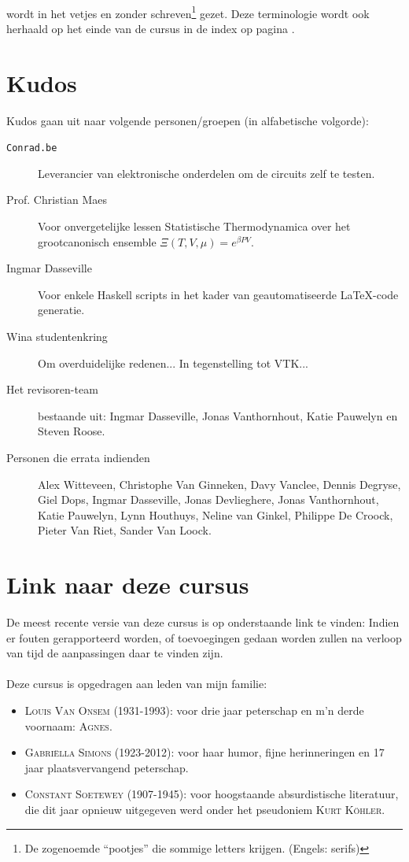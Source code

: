 \documentclass[a4paper,10pt,titlepage]{book}
\begin{document}
\begin{it}
\paragraph{}
 wordt in het vetjes en zonder schreven\footnote{De zogenoemde ``pootjes'' die sommige letters krijgen. (Engels: serifs)} gezet. Deze terminologie wordt ook herhaald op het einde van de cursus in de index op pagina \pageref{idx}.

\section*{Kudos}
Kudos gaan uit naar volgende personen/groepen (in alfabetische volgorde):
\begin{description}
 \item[\texttt{Conrad.be}] Leverancier van elektronische onderdelen om de circuits zelf te testen.
 \item[Prof. Christian Maes] Voor onvergetelijke lessen Statistische Thermodynamica over het grootcanonisch ensemble $\Xi\left(T,V,\mu\right)=e^{\beta PV}$.
 \item[Ingmar Dasseville] Voor enkele Haskell scripts in het kader van geautomatiseerde \LaTeX-code generatie.
 \item[Wina studentenkring] Om overduidelijke redenen... In tegenstelling tot VTK...
 \item[Het revisoren-team] bestaande uit: Ingmar Dasseville, Jonas Vanthornhout, Katie Pauwelyn en Steven Roose.
 \item[Personen die errata indienden] Alex Witteveen, Christophe Van Ginneken, Davy Vanclee, Dennis Degryse, Giel Dops, Ingmar Dasseville, Jonas Devlieghere, Jonas Vanthornhout, Katie Pauwelyn, Lynn Houthuys, Neline van Ginkel, Philippe De Croock, Pieter Van Riet, Sander Van Loock.
\end{description}
\section*{Link naar deze cursus}
De meest recente versie van deze cursus is op onderstaande link te vinden:
Indien er fouten gerapporteerd worden, of toevoegingen gedaan worden zullen na verloop van tijd de aanpassingen daar te vinden zijn.
\paragraph{}Deze cursus is opgedragen aan leden van mijn familie:
\begin{itemize}
 \item \textsc{Louis Van Onsem (1931-1993)}: voor drie jaar peterschap en m'n derde voornaam: \textsc{Agnes}.%
 \item \textsc{Gabri\"ella Simons (1923-2012)}: voor haar humor, fijne herinneringen en 17 jaar plaatsvervangend peterschap.
 \item \textsc{Constant Soetewey (1907-1945)}: voor hoogstaande absurdistische literatuur, die dit jaar opnieuw uitgegeven werd\cite{Kohler} onder het pseudoniem \textsc{Kurt K\"ohler}.
\end{itemize}
\end{it}
\end{document}

